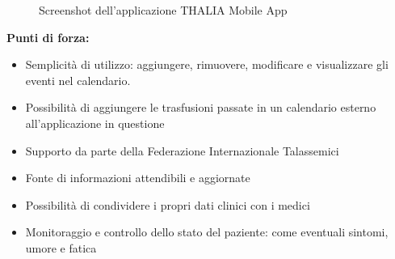 \documentclass[12pt,a4paper,openright,twoside]{report}
\begin{document}
\begin{figure}[H]
\centering
{} \quad
{} \quad
{} \quad
\caption{Screenshot dell'applicazione THALIA Mobile App}
\label{thaliaD}
\end{figure}

\textbf{Punti di forza:}
\begin{itemize}
    \item Semplicità di utilizzo: aggiungere, rimuovere, modificare e visualizzare gli eventi nel calendario.
    \item Possibilità di aggiungere le trasfusioni passate in un calendario esterno all'applicazione in questione
    \item Supporto da parte della Federazione Internazionale Talassemici
    \item Fonte di informazioni attendibili e aggiornate
    \item Possibilità di condividere i propri dati clinici con i medici
    \item Monitoraggio e controllo dello stato del paziente: come eventuali sintomi, umore e fatica
\end{itemize}
\end{document}
